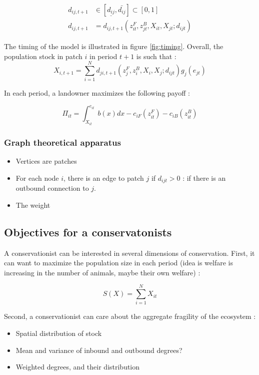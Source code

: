 \documentclass{article}
\begin{document}
\begin{align}
d_{ij, t+1} &\in [\underline{d_{ij}}, \bar{d_{ij}}] \subset [0,1] \\
d_{ij, t+1} & = d_{ij, t+1}\left(z_{it}^F, z_{jt}^B, X_{it}, X_{jt}; d_{ijt}\right)
\label{eq:dispersal}
\end{align}


The timing of the model is illustrated in figure \ref{fig:timing}. Overall, the population stock in patch $i$ in period $t+1$ is such that : 
\begin{equation}
X_{i,t+1} = \sum_{i=1}^N d_{ji,t+1}\left(z_j^F, z_i^B, X_i, X_j; d_{ijt}\right) g_j(e_{jt})
\end{equation}

In each period, a landowner maximizes the following payoff : 

\begin{equation}
\Pi_{it} = \int_{X_{it}}^{e_{it}} b(x)dx - c_{iF}(z_{it}^F) - c_{iB}(z_{it}^B)
\end{equation}

\subsubsection{Graph theoretical apparatus}

\begin{itemize}
\item Vertices are patches
\item For each node $i$, there is an edge to patch $j$ if $d_{ijt}>0$ : if there is an outbound connection to $j$.  
\item The weight
\end{itemize}

\subsection{Objectives for a conservatonists}

A conservationist can be interested in several dimensions of conservation. 
First, it can want to maximize the population size in each period (idea is welfare is increasing in the number of animals, maybe their own welfare) : 

\begin{equation}
S(X) = \sum_{i=1}^N X_{it}
\end{equation} 

Second, a conservationist can care about the aggregate fragility of the ecosystem : 
\begin{itemize}
\item Spatial distribution of stock
\item Mean and variance of inbound and outbound degrees?
\item Weighted degrees, and their distribution
\end{itemize}
\end{document}

